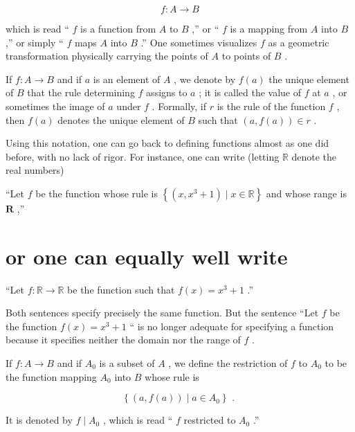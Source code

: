 \[
f : A \rightarrow  B
\]

which is read `` \(f\) is a function from \(A\) to \(B\) ,'' or `` \(f\) is a mapping from \(A\) into \(B\) ,'' or simply `` \(f\) maps \(A\) into \(B\) .'' One sometimes visualizes \(f\) as a geometric transformation physically carrying the points of \(A\) to points of \(B\) .

If \(f : A \rightarrow  B\) and if \(a\) is an element of \(A\) , we denote by \(f\left( a\right)\) the unique element of \(B\) that the rule determining \(f\) assigns to \(a\) ; it is called the value of \(f\) at \(a\) , or sometimes the image of \(a\) under \(f\) . Formally, if \(r\) is the rule of the function \(f\) , then \(f\left( a\right)\) denotes the unique element of \(B\) such that \(\left( {a,f\left( a\right) }\right)  \in  r\) .

Using this notation, one can go back to defining functions almost as one did before, with no lack of rigor. For instance, one can write (letting \(\mathbb{R}\) denote the real numbers)

``Let \(f\) be the function whose rule is \(\left\{  {\left( {x,{x}^{3} + 1}\right)  \mid  x \in  \mathbb{R}}\right\}\) and whose range is \(\mathbf{R}\) ,''

\section*{or one can equally well write}

``Let \(f : \mathbb{R} \rightarrow  \mathbb{R}\) be the function such that \(f\left( x\right)  = {x}^{3} + 1\) .''

Both sentences specify precisely the same function. But the sentence ``Let \(f\) be the function \(f\left( x\right)  = {x}^{3} + 1\) `` is no longer adequate for specifying a function because it specifies neither the domain nor the range of \(f\) .



\begin{definition} If \(f : A \rightarrow  B\) and if \({A}_{0}\) is a subset of \(A\) , we define the restriction of \(f\) to \({A}_{0}\) to be the function mapping \({A}_{0}\) into \(B\) whose rule is

\[
\left\{  {\left( {a,f\left( a\right) }\right)  \mid  a \in  {A}_{0}}\right\}  \text{ . }
\]

It is denoted by \(f \mid  {A}_{0}\) , which is read `` \(f\) restricted to \({A}_{0}\) .''
\end{definition}


